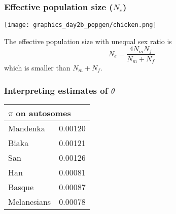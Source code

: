 \documentclass{beamer}
\newcommand{\1}{\ensuremath{\mathbf{1}}}
\begin{document}
%
%
%
%
%
%
\begin{frame}\frametitle{Effective population size ($N_e$)}
	\begin{center}
		\texttt{[image: graphics\_day2b\_popgen/chicken.png]}
	\end{center}
	The effective population size with unequal sex ratio is
	\begin{equation}
		N_e = \frac{4N_m N_f}{N_m + N_f}
	\end{equation}
	which is smaller than $N_m + N_f$.
\end{frame}
%
%
%
\begin{frame}\frametitle{Interpreting estimates of $\theta$}
	\begin{center}
		\begin{tabular}{ll}
			\toprule
			\multicolumn{2}{l}{$\pi$ on autosomes}	\\
			\midrule
			Mandenka	& 0.00120	\\
			Biaka		& 0.00121	\\
			San			& 0.00126	\\
			Han			& 0.00081	\\
			Basque		& 0.00087	\\
			Melanesians	& 0.00078	\\
			\bottomrule
	   	\end{tabular}	
	\end{center}
\end{frame}
\end{document}
